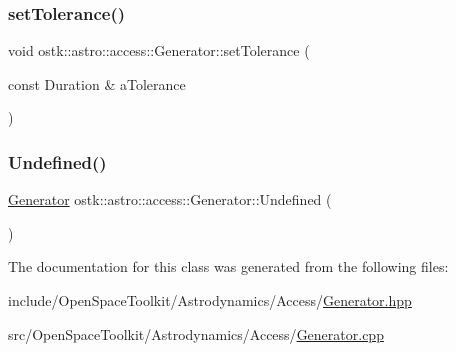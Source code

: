 \mbox{\label{classostk_1_1astro_1_1access_1_1_generator_a9590a1ebb05d28f7934f8ccafbd02a60}} 
\subsubsection{\texorpdfstring{set\+Tolerance()}{setTolerance()}}
{\footnotesize\ttfamily void ostk\+::astro\+::access\+::\+Generator\+::set\+Tolerance (\begin{DoxyParamCaption}\item[{const Duration \&}]{a\+Tolerance }\end{DoxyParamCaption})}

\mbox{\label{classostk_1_1astro_1_1access_1_1_generator_a1fb2dd3d88187da24482168337a23ade}} 
\subsubsection{\texorpdfstring{Undefined()}{Undefined()}}
{\footnotesize\ttfamily \hyperlink{classostk_1_1astro_1_1access_1_1_generator}{Generator} ostk\+::astro\+::access\+::\+Generator\+::\+Undefined (\begin{DoxyParamCaption}{ }\end{DoxyParamCaption})\hspace{0.3cm}{\ttfamily [static]}}



The documentation for this class was generated from the following files\+:\begin{DoxyCompactItemize}
\item 
include/\+Open\+Space\+Toolkit/\+Astrodynamics/\+Access/\hyperlink{_generator_8hpp}{Generator.\+hpp}\item 
src/\+Open\+Space\+Toolkit/\+Astrodynamics/\+Access/\hyperlink{_generator_8cpp}{Generator.\+cpp}\end{DoxyCompactItemize}
